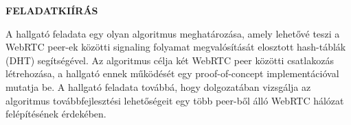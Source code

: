\clearpage
\begin{center}
    \large
    \textbf{FELADATKIÍRÁS}\\
\end{center}

A hallgató feladata egy olyan algoritmus meghatározása, amely lehetővé teszi a WebRTC peer-ek közötti signaling folyamat
megvalósítását elosztott hash-táblák (DHT) segítségével.
Az algoritmus célja két WebRTC peer közötti csatlakozás létrehozása, a hallgató ennek működését egy proof-of-concept
implementációval mutatja be.
A hallgató feladata továbbá, hogy dolgozatában vizsgálja az algoritmus továbbfejlesztési lehetőségeit egy több peer-ből
álló WebRTC hálózat felépítésének érdekében.